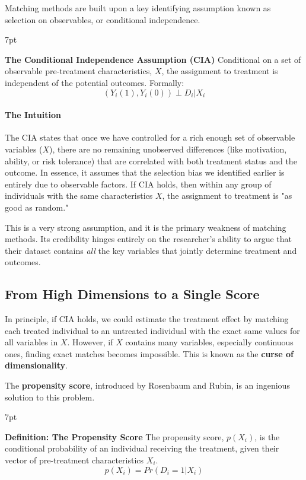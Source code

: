\documentclass{article}
\newenvironment{greenblock}{%
\def\FrameCommand{%
  \hspace{1pt}%
    {\color{Green}%
    \vrule width 2pt}%
    {\color{greenshade}%
    \vrule width 4pt}%
  \colorbox{greenshade}%
}%
\MakeFramed{%
  \advance%
  \hsize-%
  \width%
  \FrameRestore}%
\noindent\hspace{-4.55pt}%
\begin{adjustwidth}{}{7pt}%
\vspace{2pt}\vspace{2pt}%
}
{%
\vspace{2pt}\end{adjustwidth}\endMakeFramed%
}
\newenvironment{redblock}{
\def\FrameCommand{
  \hspace{1pt}
    {\color{LightCoral}
    \vrule width 2pt}
    {\color{redshade}
    \vrule width 4pt}
  \colorbox{redshade}
}
\MakeFramed{
  \advance
  \hsize-
  \width
  \FrameRestore}
\noindent\hspace{-4.55pt}%
\begin{adjustwidth}{}{7pt}
\vspace{2pt}\vspace{2pt}
}
{\vspace{2pt}\end{adjustwidth}\endMakeFramed}
\begin{document}
Matching methods are built upon a key identifying assumption known as selection on observables, or conditional independence.

\begin{redblock}
\textbf{The Conditional Independence Assumption (CIA)}
Conditional on a set of observable pre-treatment characteristics, $X$, the assignment to treatment is independent of the potential outcomes. Formally:
\begin{equation}
(Y_i(1), Y_i(0)) \perp D_i | X_i
\end{equation}
\end{redblock}

\paragraph{The Intuition}
The CIA states that once we have controlled for a rich enough set of observable variables ($X$), there are no remaining unobserved differences (like motivation, ability, or risk tolerance) that are correlated with both treatment status and the outcome. In essence, it assumes that the selection bias we identified earlier is entirely due to observable factors. If CIA holds, then within any group of individuals with the same characteristics $X$, the assignment to treatment is "as good as random."

This is a very strong assumption, and it is the primary weakness of matching methods. Its credibility hinges entirely on the researcher's ability to argue that their dataset contains \textit{all} the key variables that jointly determine treatment and outcomes.

\subsection{From High Dimensions to a Single Score}
\label{sub:propensity_score}

In principle, if CIA holds, we could estimate the treatment effect by matching each treated individual to an untreated individual with the exact same values for all variables in $X$. However, if $X$ contains many variables, especially continuous ones, finding exact matches becomes impossible. This is known as the \textbf{curse of dimensionality}.

The \textbf{propensity score}, introduced by Rosenbaum and Rubin, is an ingenious solution to this problem.

\begin{greenblock}
\textbf{Definition: The Propensity Score}
The propensity score, $p(X_i)$, is the conditional probability of an individual receiving the treatment, given their vector of pre-treatment characteristics $X_i$.
\begin{equation}
    p(X_i) = Pr(D_i = 1 | X_i)
\end{equation}
\end{greenblock}
\end{document}
